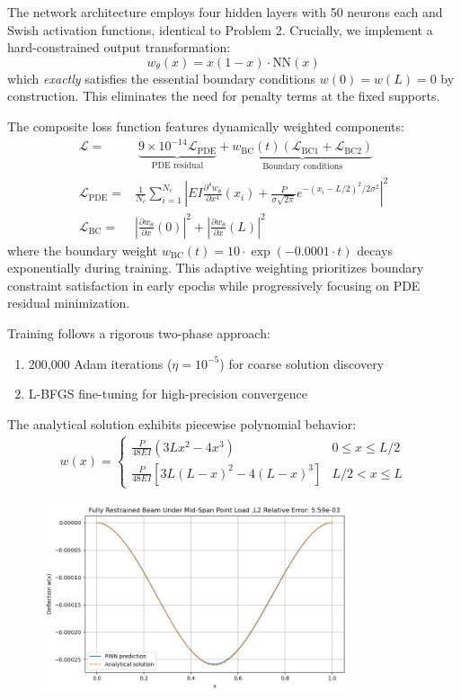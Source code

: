 \documentclass[12pt]{article}
\begin{document}
The network architecture employs four hidden layers with 50 neurons each and Swish activation functions, identical to Problem 2. Crucially, we implement a hard-constrained output transformation:
\[
w_{\theta}(x) = x(1-x) \cdot \text{NN}(x)
\]
which \textit{exactly} satisfies the essential boundary conditions $w(0) = w(L) = 0$ by construction. This eliminates the need for penalty terms at the fixed supports.

The composite loss function features dynamically weighted components:
\begin{align*}
\mathcal{L} = &\; \underbrace{9 \times 10^{-14} \mathcal{L}_{\text{PDE}}}_{\text{PDE residual}} + \underbrace{w_{\text{BC}}(t) \left( \mathcal{L}_{\text{BC1}} + \mathcal{L}_{\text{BC2}} \right)}_{\text{Boundary conditions}} \\
\mathcal{L}_{\text{PDE}} = &\frac{1}{N_c} \sum_{i=1}^{N_c} \left|EI \frac{\partial^4 w_\theta}{\partial x^4}(x_i) + \frac{P}{\sigma\sqrt{2\pi}} e^{-(x_i-L/2)^2/2\sigma^2} \right|^2 \\
\mathcal{L}_{\text{BC}} = &\left|\frac{\partial w_\theta}{\partial x}(0)\right|^2 + \left|\frac{\partial w_\theta}{\partial x}(L)\right|^2
\end{align*}
where the boundary weight $w_{\text{BC}}(t) = 10 \cdot \exp(-0.0001 \cdot t)$ decays exponentially during training. This adaptive weighting prioritizes boundary constraint satisfaction in early epochs while progressively focusing on PDE residual minimization.

Training follows a rigorous two-phase approach: 
\begin{enumerate}
    \item 200,000 Adam iterations ($\eta = 10^{-5}$) for coarse solution discovery
    \item L-BFGS fine-tuning for high-precision convergence
\end{enumerate}

The analytical solution exhibits piecewise polynomial behavior:
\begin{align*}
w(x) = 
\begin{cases} 
\frac{P}{48EI}(3Lx^2 - 4x^3) & 0 \leq x \leq L/2 \\
\frac{P}{48EI}[3L(L-x)^2 - 4(L-x)^3] & L/2 < x \leq L 
\end{cases}
\end{align*}

\begin{figure}[htbp]
  \centering
  \includegraphics[width=0.8\textwidth]{mid_span_restrained_results}
  \caption{}
  \label{fig:mid-span_restrained}
\end{figure}
\end{document}
